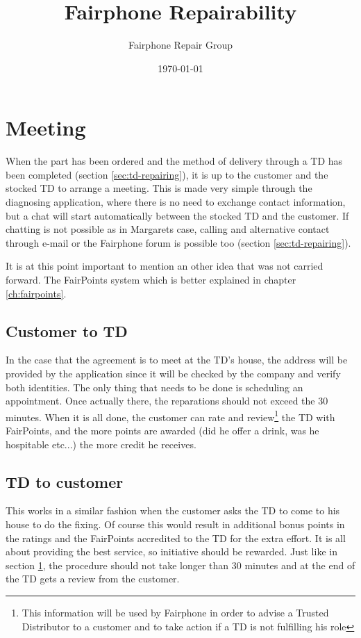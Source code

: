 \documentclass[final,a4paper]{report} %
\author{Fairphone Repair Group}
\title{Fairphone Repairability}
\date{\today}
\begin{document}
	\section{Meeting}
	\label{sec:storyboard-meeting}
	When the part has been ordered and the method of delivery through a TD has been completed (section \ref{sec:td-repairing}), it is up to the customer and the stocked TD to arrange a meeting. This is made very simple through the diagnosing application, where there is no need to exchange contact information, but a chat will start automatically between the stocked TD and the customer. If chatting is not possible as in Margarets case, calling and alternative contact through e-mail or the Fairphone forum is possible too (section \ref{sec:td-repairing}).
	
	It is at this point important to mention an other idea that was not carried forward. The FairPoints system which is better explained in chapter \ref{ch:fairpoints}.
	
	\subsection{Customer to TD}
	In the case that the agreement is to meet at the TD's house, the address will be provided by the application since it will be checked by the company and verify both identities. The only thing that needs to be done is scheduling an appointment. Once actually there, the reparations should not exceed the 30 minutes. When it is all done, the customer can rate and review\footnote{This information will be used by Fairphone in order to advise a Trusted Distributor to a customer and to take action if a TD is not fulfilling his role} the TD with FairPoints, and the more points are awarded (did he offer a drink, was he hospitable etc...) the more credit he receives.
	
	\subsection{TD to customer}
	This works in a similar fashion when the customer asks the TD to come to his house to do the fixing. Of course this would result in additional bonus points in the ratings and the FairPoints accredited to the TD for the extra effort. It is all about providing the best service, so initiative should be rewarded. Just like in section \ref{sec:storyboard-meeting}, the procedure should not take longer than 30 minutes and at the end of the TD gets a review from the customer.
	
\end{document}
